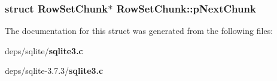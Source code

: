 \subsubsection{\setlength{\rightskip}{0pt plus 5cm}struct \bf{Row\-Set\-Chunk}$\ast$ \bf{Row\-Set\-Chunk::p\-Next\-Chunk}}\label{structRowSetChunk_c41ec5d4f54ce8aa1e343494aafdb00d}




The documentation for this struct was generated from the following files:\begin{CompactItemize}
\item 
deps/sqlite/\bf{sqlite3.c}\item 
deps/sqlite-3.7.3/\bf{sqlite3.c}\end{CompactItemize}
